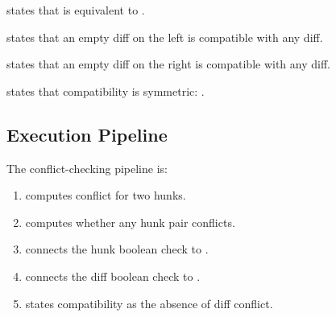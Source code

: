 \begin{theorem}
 states that 
is equivalent to .
\end{theorem}

\begin{theorem}
 states that an empty diff on the left is
compatible with any diff.
\end{theorem}

\begin{theorem}
 states that an empty diff on the right is
compatible with any diff.
\end{theorem}

\begin{theorem}
 states that compatibility is symmetric:
.
\end{theorem}

\subsection{Execution Pipeline}

The conflict-checking pipeline is:

\begin{enumerate}
  \item {} computes conflict for two hunks.
  \item {} computes whether any hunk pair conflicts.
  \item {} connects the hunk boolean check to
    .
  \item {} connects the diff boolean check to
    .
  \item {} states compatibility as the
    absence of diff conflict.
\end{enumerate}
